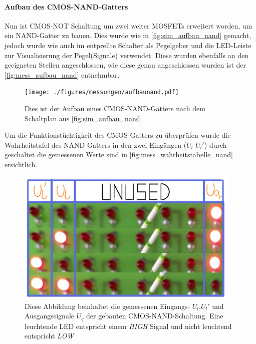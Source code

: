 \documentclass[12pt,english,ngerman]{scrartcl}
\begin{document}
\paragraph{Aufbau des CMOS-NAND-Gatters}
Nun ist CMOS-NOT Schaltung um zwei weiter MOSFETs erweitert worden, um ein
NAND-Gatter zu bauen. Dies wurde wie in \autoref{fig:sim_aufbau_nand} gemacht,
jedoch wurde wie auch im  entprellte Schalter als
Pegelgeber und die LED-Leiste zur Visualisierung der Pegel(Signale) verwendet.
Diese wurden ebenfalls an den geeigneten Stellen angeschlossen, wie diese genau
angeschlossen wurden ist der \autoref{fig:mess_aufbau_nand} entnehmbar.

\begin{figure}[H]
  \centering
    \texttt{[image: ./figures/messungen/aufbaunand.pdf]}
  \caption{Dies ist der Aufbau eines CMOS-NAND-Gatters nach dem Schaltplan aus
  \autoref{fig:sim_aufbau_nand}}
  \label{fig:mess_aufbau_nand}
\end{figure}

Um die Funktionstüchtigkeit des CMOS-Gatters zu überprüfen wurde die
Wahrheitstafel des NAND-Gatters in den zwei Eingängen ($U_l$ $U_l'$) durch
geschaltet die gemessenen Werte sind in \autoref{fig:mess_wahrheitstabelle_nand}
ersichtlich.


\begin{figure}[H]
  \centering
    \includegraphics[width=0.95\textwidth]{./figures/messungen/WahrheitstabelleNAND.pdf}
  \caption{Diese Abbildung beinhaltet die gemessenen Eingangs- $U_l$,$U_l'$ und
  Ausgangssignale $U_q$ der gebauten CMOS-NAND-Schaltung. Eine leuchtende
  LED entspricht einem \textit{HIGH} Signal und nicht leuchtend entspricht
  \textit{LOW}}
  \label{fig:mess_wahrheitstabelle_nand}
\end{figure}
\end{document}
